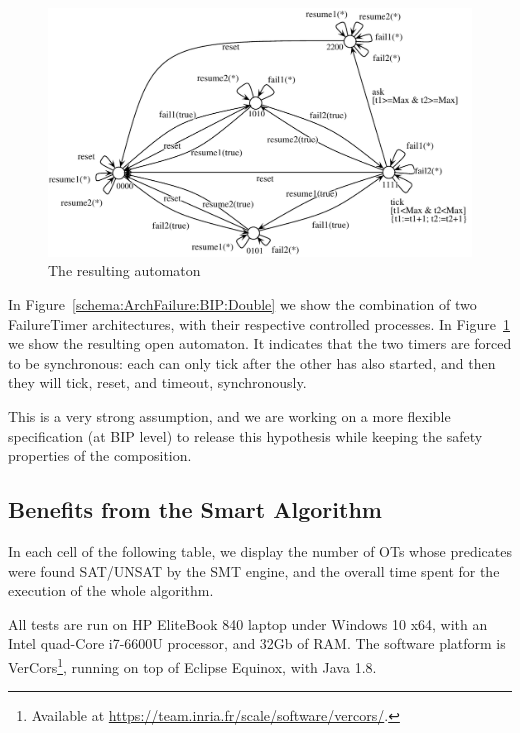 \documentclass[smallcondensed]{svjour3}
\begin{document}
\begin{figure}[ht]
  \centering
  \includegraphics[width=0.9\columnwidth]{ActaXFIG/Double-OA}
  \caption{The resulting automaton}
  \label{schema:ArchFailure:Double:OA}
\end{figure}

In Figure~\ref{schema:ArchFailure:BIP:Double} we show the combination
of two FailureTimer architectures, with their respective controlled
processes.
In Figure~\ref{schema:ArchFailure:Double:OA} we show the resulting
open automaton. It indicates that the two timers are forced to
be synchronous: each can only tick after the other has also started,
and then they will tick, reset, and timeout, synchronously.

This is a very strong assumption, and we are working on a more
flexible specification (at BIP level) to release this hypothesis while
keeping the safety properties of the composition.





\subsection{Benefits from the Smart Algorithm}

In each cell of the following table, we display the number of OTs whose predicates were found SAT/UNSAT by the SMT engine, and the overall time spent for the execution of the whole algorithm.

All tests are run on HP EliteBook 840 laptop under Windows 10 x64, with an Intel quad-Core i7-6600U
processor, and 32Gb of RAM. The software platform is VerCors\footnote{Available at \url{https://team.inria.fr/scale/software/vercors/}.}, running on top of
Eclipse Equinox, with Java 1.8.
\end{document}
